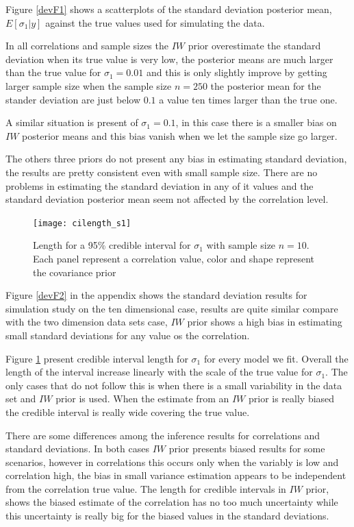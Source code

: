 \documentclass{article}
\begin{document}
Figure \ref{devF1} shows a scatterplots of the standard deviation posterior mean, $E[\sigma_1\vert y]$  against the true values used for simulating the data. 

In all correlations and sample sizes the $IW$ prior overestimate the standard deviation when its true value is very low, the posterior means are much larger than the true value for $\sigma_1=0.01$ and this is only slightly improve by getting larger sample size when the sample size $n=250$ the posterior mean for the stander deviation are just below $0.1$ a value ten times larger than the true one.  

A similar situation is present of $\sigma_1=0.1$, in this case there is a smaller bias on $IW$ posterior means and this bias vanish when we let the sample size go larger.  

The others three priors do not present any bias in estimating standard deviation, the results are pretty consistent even with small sample size. There are no problems in estimating the standard deviation in any of it values and the standard deviation posterior mean seem not affected by the correlation level.  

\begin{figure}[htbp]
   \centering
   \texttt{[image: cilength\_s1]}
    \vspace{-.5in}
   \caption{Length for a 95\% credible interval for $\sigma_1$ with sample size $n=10$. Each panel represent a correlation value,  color and shape represent the covariance prior \label{devF3} }
\end{figure}
Figure \ref{devF2} in the appendix shows the standard deviation results for simulation study on the ten dimensional case, results are quite similar compare with the two dimension data sets case, $IW$ prior shows a high bias in estimating small standard deviations for any value os the correlation.  

Figure \ref{devF3} present credible interval length for $\sigma_1$ for every model we fit. Overall the length of the interval increase linearly with the scale of the true value for $\sigma_1$. The only cases that do not follow this is when there is a small variability in the data set and $IW$ prior is used. When the estimate from an $IW$  prior is really biased the credible interval is really wide covering the true value. 

There are some differences among the inference results for correlations and standard deviations. In both cases $IW$ prior presents biased results for some scenarios, however in correlations this occurs only when the variably is low and correlation high, the bias in small variance estimation appears to be independent from the correlation true value.  The length for credible intervals in $IW$ prior, shows the biased estimate of the correlation has no too much uncertainty while this uncertainty is really big for the biased values in the standard deviations. 
\end{document}
